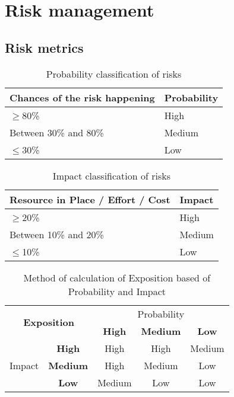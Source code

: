 \section{Risk management}

\subsection{Risk metrics}

\begin{table}[H]
	\centering
	\begin{tabular}{|l|l|}
		\hline
		\rowcolor{gray!30}
		Chances of the risk happening & Probability \\ \hline
		$\geq$80\% & \cellcolor{red!60}High\\ \hline
		Between 30\% and 80\% & \cellcolor{yellow!40}Medium\\ \hline
		$\leq$30\% & \cellcolor{green!60}Low\\ \hline
	\end{tabular}
	\caption{Probability classification of risks}
\end{table}


\begin{table}[H]
	\centering
	\begin{tabular}{|l|l|}
		\hline
		\rowcolor{gray!30}
		Resource in Place / Effort / Cost & Impact \\ \hline
		$\geq$20\% & \cellcolor{red!60}High\\ \hline
		Between 10\% and 20\% & \cellcolor{yellow!40}Medium\\ \hline
		$\leq$10\% & \cellcolor{green!60}Low\\ \hline
	\end{tabular}
	\caption{Impact classification of risks}
\end{table}


\begin{table}[H]
	\centering
	\begin{tabular}{|c|c|c|c|c|}
	\hline
		\multicolumn{2}{|c|}{\multirow{2}{*}{\large\textbf{Exposition}}} & \multicolumn{3}{c|}{Probability}\\
		\multicolumn{2}{|c|}{} & \cellcolor{gray!15}\textbf{High} & \cellcolor{gray!15}\textbf{Medium} & \cellcolor{gray!15}\textbf{Low}\\ \hline %
		\multirow{3}{*}{Impact} & \cellcolor{gray!15}\textbf{High} & \cellcolor{red!60}High & \cellcolor{red!60}High & \cellcolor{yellow!40}Medium\\
		& \cellcolor{gray!15}\textbf{Medium} & \cellcolor{red!60}High & \cellcolor{yellow!40}Medium & \cellcolor{green!60}Low\\
		& \cellcolor{gray!15}\textbf{Low} & \cellcolor{yellow!40}Medium & \cellcolor{green!60}Low & \cellcolor{green!60}Low\\ \hline
	\end{tabular}
	\caption{Method of calculation of Exposition based of Probability and Impact}
\end{table}

